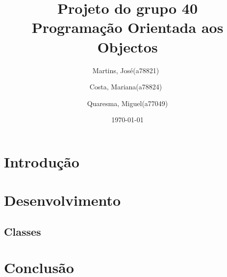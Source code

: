 \documentclass[a4paper,12pt,portuguese]{report}
\title{Projeto do grupo 40 \\Programação Orientada aos Objectos}
\author{Martins, José(a78821)\
        \and
        Costa, Mariana(a78824)\
        \and
        Quaresma, Miguel(a77049)
        }
\date{\today}
\begin{document}
 
\begin{titlepage}
\maketitle
\end{titlepage}
 
\tableofcontents
 
\chapter{Introdução}


\chapter{Desenvolvimento}

\section{Classes}


\chapter{Conclusão}
\end{document}
